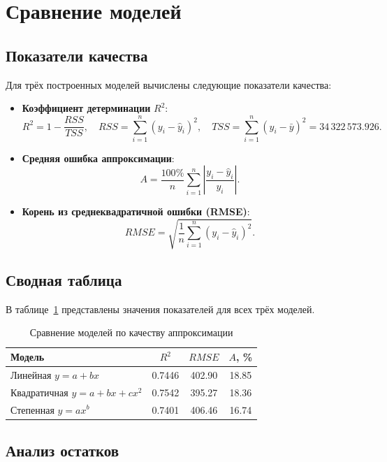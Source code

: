 \section{Сравнение моделей}

\subsection{Показатели качества}

Для трёх построенных моделей вычислены следующие показатели качества:

\begin{itemize}
    \item \textbf{Коэффициент детерминации} \(R^2\):
    \[
    R^2 = 1 - \frac{RSS}{TSS}, \quad
    RSS = \sum_{i=1}^{n}(y_i - \hat{y}_i)^2, \quad
    TSS = \sum_{i=1}^{n}(y_i - \bar{y})^2 = 34\,322\,573.926.
    \]

    \item \textbf{Средняя ошибка аппроксимации}:
    \[
    A = \frac{100\%}{n}\sum_{i=1}^{n}\left|\frac{y_i - \hat{y}_i}{y_i}\right|.
    \]

    \item \textbf{Корень из среднеквадратичной ошибки (RMSE)}:
    \[
    RMSE = \sqrt{\frac{1}{n}\sum_{i=1}^{n}(y_i - \hat{y}_i)^2}.
    \]
\end{itemize}

\subsection{Сводная таблица}

В таблице~\ref{tab:comparison} представлены значения показателей для всех трёх моделей.

\begin{table}[H]
\centering
\caption{Сравнение моделей по качеству аппроксимации}
\label{tab:comparison}
\begin{tabular}{lccc}
\toprule
Модель & \(R^2\) & \(RMSE\) & \(A\), \% \\
\midrule
Линейная \(y = a + bx\) & 0.7446 & 402.90 & 18.85 \\
Квадратичная \(y = a + bx + cx^2\) & 0.7542 & 395.27 & 18.36 \\
Степенная \(y = a x^b\) & 0.7401 & 406.46 & 16.74 \\
\bottomrule
\end{tabular}
\end{table}

\subsection{Анализ остатков}

